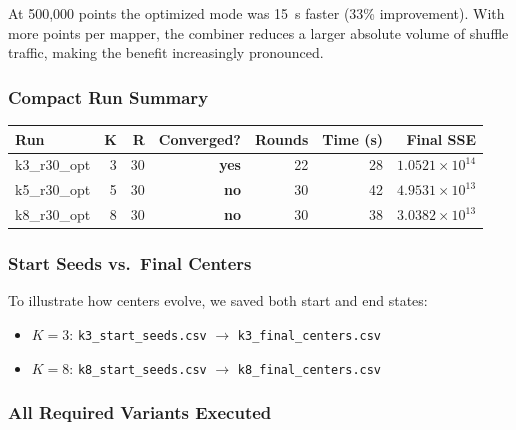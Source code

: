 \documentclass[11pt]{article}
\begin{document}
At 500,000 points the optimized mode was 15~s faster (33\% improvement). With more points per mapper, the combiner reduces a larger absolute volume of shuffle traffic, making the benefit increasingly pronounced.

\subsubsection*{Compact Run Summary}

\begin{center}
\begin{tabular}{@{}lrrrrrr@{}}
  \rowcolor{tableheader}
  \color{white}\textbf{Run} &
  \color{white}\textbf{K} &
  \color{white}\textbf{R} &
  \color{white}\textbf{Converged?} &
  \color{white}\textbf{Rounds} &
  \color{white}\textbf{Time (s)} &
  \color{white}\textbf{Final SSE} \\
  \midrule
  k3\_r30\_opt & 3 & 30 & \textcolor{okgreen}{\textbf{yes}} & 22 & 28 & $1.0521\times10^{14}$ \\
  \rowcolor{tablealt}
  k5\_r30\_opt & 5 & 30 & \textcolor{warnred}{\textbf{no}}  & 30 & 42 & $4.9531\times10^{13}$ \\
  k8\_r30\_opt & 8 & 30 & \textcolor{warnred}{\textbf{no}}  & 30 & 38 & $3.0382\times10^{13}$ \\
\end{tabular}
\end{center}

\subsubsection*{Start Seeds vs.\ Final Centers}

To illustrate how centers evolve, we saved both start and end states:
\begin{itemize}[noitemsep,topsep=2pt]
  \item $K=3$: \texttt{k3\_start\_seeds.csv} $\rightarrow$ \texttt{k3\_final\_centers.csv}
  \item $K=8$: \texttt{k8\_start\_seeds.csv} $\rightarrow$ \texttt{k8\_final\_centers.csv}
\end{itemize}

\subsubsection*{All Required Variants Executed}
\end{document}
